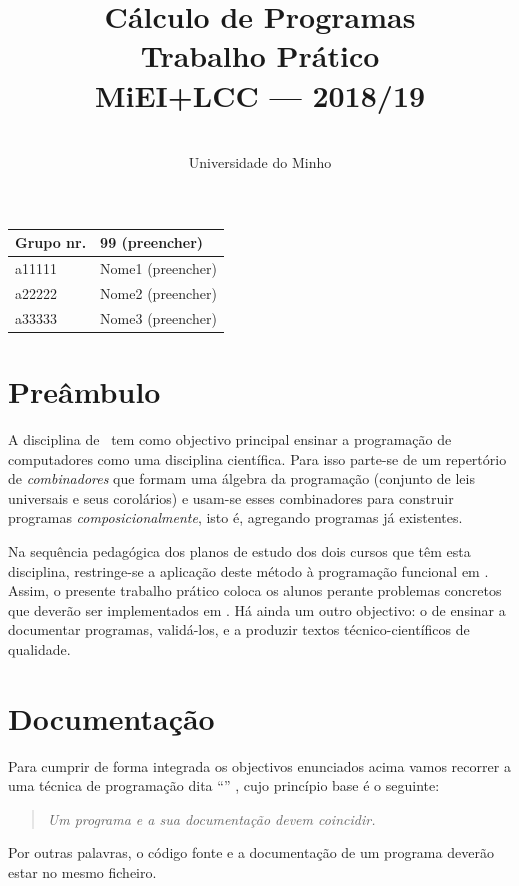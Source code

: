\documentclass[a4paper]{article}
\title{
       	    Cálculo de Programas
\\
       	Trabalho Prático
\\
       	MiEI+LCC --- 2018/19
}
\author{
       	\dium
\\
       	Universidade do Minho
}
\date\mydate
\begin{document}
\maketitle

\begin{center}\large
\begin{tabular}{ll}
\textbf{Grupo} nr. & 99 (preencher)
\\\hline
a11111 & Nome1 (preencher)	
\\
a22222 & Nome2 (preencher)	
\\
a33333 & Nome3 (preencher)	
\end{tabular}
\end{center}

\section{Preâmbulo}

A disciplina de \CP\ tem como objectivo principal ensinar
a progra\-mação de computadores como uma disciplina científica. Para isso
parte-se de um repertório de \emph{combinadores} que formam uma álgebra da
programação (conjunto de leis universais e seus corolários) e usam-se esses
combinadores para construir programas \emph{composicionalmente}, isto é,
agregando programas já existentes.
  
Na sequência pedagógica dos planos de estudo dos dois cursos que têm
esta disciplina, restringe-se a aplicação deste método à programação
funcional em \Haskell. Assim, o presente trabalho prático coloca os
alunos perante problemas concretos que deverão ser implementados em
\Haskell.  Há ainda um outro objectivo: o de ensinar a documentar
programas, validá-los, e a produzir textos técnico-científicos de
qualidade.

\section{Documentação} Para cumprir de forma integrada os objectivos
enunciados acima vamos recorrer a uma técnica de programa\-ção dita
``'' \cite{Kn92}, cujo princípio base é o seguinte:
\begin{quote}\em Um programa e a sua documentação devem coincidir.
\end{quote} Por outras palavras, o código fonte e a documentação de um
programa deverão estar no mesmo ficheiro.
\end{document}

